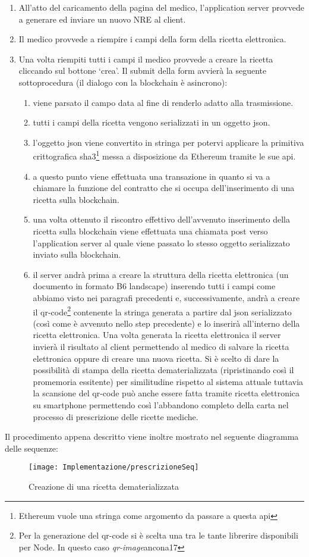 \begin{enumerate}
	\item All'atto del caricamento della pagina del medico, l'application server provvede a generare ed inviare un nuovo NRE al client.
	\item Il medico provvede a riempire i campi della form della ricetta elettronica.
	\item Una volta riempiti tutti i campi il medico provvede a creare la ricetta cliccando sul bottone \enquote*{crea}. Il submit della form avvierà la seguente sottoprocedura (il dialogo con la blockchain è asincrono):
	      \begin{enumerate}
	      	\item viene parsato il campo data al fine di renderlo adatto alla trasmissione.
	      	\item tutti i campi della ricetta vengono serializzati in un oggetto json. 
	      	\item l'oggetto json viene convertito in stringa per potervi applicare la primitiva crittografica sha3\footnote{Ethereum vuole una stringa come argomento da passare a questa api} messa a disposizione da Ethereum tramite le sue api. 
	      	\item a questo punto viene effettuata una transazione in quanto si va a chiamare la funzione del contratto che si occupa dell'inserimento di una ricetta sulla blockchain.
	      	\item una volta ottenuto il riscontro effettivo dell'avvenuto inserimento della ricetta sulla blockchain viene effettuata una chiamata post verso l'application server al quale viene passato lo stesso oggetto serializzato inviato sulla blockchain. 
	      	\item il server andrà prima a creare la struttura della ricetta elettronica (un documento in formato B6 landscape) inserendo tutti i campi come abbiamo visto nei paragrafi precedenti e, successivamente, andrà a creare il qr-code\footnote{Per la generazione del qr-code si è scelta una tra le tante librerire disponibili per Node. In questo caso \emph{qr-image}ancona17} contenente la stringa generata a partire dal json serializzato (così come è avvenuto nello step precedente) e lo inserirà all'interno della ricetta elettronica. Una volta generata la ricetta elettronica il server invierà il risultato al client permettendo al medico di salvare la ricetta elettronica oppure di creare una nuova ricetta. Si è scelto di dare la possibilità di stampa della ricetta dematerializzata (ripristinando così il promemoria essitente) per similitudine rispetto al sistema attuale tuttavia la scansione del qr-code può anche essere fatta tramite ricetta elettronica su smartphone permettendo così l'abbandono completo della carta nel processo di prescrizione delle ricette mediche.
	      \end{enumerate}
\end{enumerate}
Il procedimento appena descritto viene inoltre mostrato nel seguente diagramma delle sequenze:
%
\begin{figure}[H]
	\centering
	\texttt{[image: Implementazione/prescrizioneSeq]}
	\caption{Creazione di una ricetta dematerializzata}
	\label{fig:creazione di una ricetta dematerializzata}
\end{figure}
%
